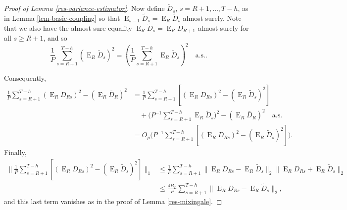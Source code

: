 \documentclass[11pt]{article}
\DeclareMathOperator{\E}{E}
\newcommand{\oosA}{\bar{D}_{R}}
\newcommand{\oosSum}[2]{\ensuremath{\sum_{#1=R+#2}^{T-\h}}}
\newcommand{\h}{h}
\begin{document}
\begin{proof}[Proof of Lemma \ref{res-variance-estimator}]
Now define $\tilde D_s$, $s = R+1,\dots,T-\h$, as in Lemma
\ref{lem-basic-coupling} so that $\E_{s-1} \tilde D_s = \E_R \tilde
D_s$ almost surely.  Note that we also have the almost sure equality
$\E_R \tilde D_s = \E_R \tilde D_{R+1}$ almost surely for all $s\geq R+1$,
and so
\[
\frac1P \oosSum{s}{1} (\E_R \tilde D_s)^2 = (\frac1P \oosSum{s}{1} \E_R
\tilde D_s)^2 \quad \text{a.s..}
\]

Consequently,
\begin{align*}
\frac1P \oosSum{s}{1} (\E_R D_{Rs})^2 - (\E_R\oosA)^2 & = 
\frac1P \oosSum{s}{1} [(\E_R D_{Rs})^2 - (\E_R\tilde D_s)^2]\\
&\quad+ \Big(P^{-1} \oosSum{s}{1} \E_R \tilde D_s\Big)^2 - (\E_R\oosA)^2 \quad \text{a.s}.\\
&= O_p\Big(P^{-1} \oosSum{s}{1} [(\E_R D_{Rs})^2 - (\E_R \tilde D_s)^2]\Big).
\end{align*}
Finally, 
\begin{align*}
\lVert \frac1P \oosSum{s}{1} [(\E_RD_{Rs})^2 - (\E_R \tilde D_s)^2] \rVert_1
&\leq \frac1P \oosSum{s}{1} \lVert \E_RD_{Rs} - \E_R \tilde D_s \rVert_2 \lVert
\E_RD_{Rs} + \E_R \tilde D_s \rVert_2
\\ &\leq \frac{4 B_L}P \oosSum{s}{1} \lVert \E_RD_{Rs} - \E_R \tilde D_s \rVert_2,
\end{align*}
and this last term vanishes as in the proof of Lemma
\ref{res-mixingale}.


\end{proof}
\end{document}
